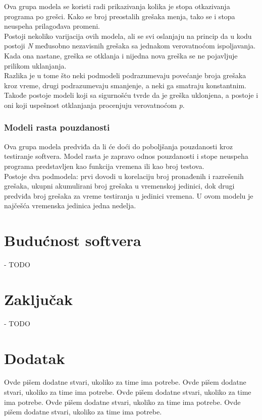 \documentclass[a4paper]{article}
\begin{document}
Ova grupa modela se koristi radi prikazivanja kolika je stopa otkazivanja programa po grešci. Kako se broj preostalih grešaka menja, tako se i stopa neuspeha prilagođava promeni.\\
Postoji nekoliko varijacija ovih modela, ali se svi oslanjaju na princip da u kodu postoji \textit{N} međusobno nezavisnih grešaka sa jednakom verovatnoćom ispoljavanja. Kada ona nastane, greška se otklanja i nijedna nova greška se ne pojavljuje prilikom uklanjanja.\\
Razlika je u tome što neki podmodeli podrazumevaju povećanje broja grešaka kroz vreme, drugi podrazumevaju smanjenje, a neki ga smatraju konstantnim. Takođe postoje modeli koji sa sigurnošću tvrde da je greška uklonjena, a postoje i oni koji uspešnost otklanjanja procenjuju verovatnoćom \textit{p}.

\subsubsection{Modeli rasta pouzdanosti}
\label{subsec:rast_pouzdanosti}

Ova grupa modela predviđa da li će doći do poboljšanja pouzdanosti kroz testiranje softvera. Model rasta je zapravo odnos pouzdanosti i stope neuspeha programa predstavljen kao funkcija vremena ili kao broj testova.\\
Postoje dva podmodela: prvi dovodi u korelaciju broj pronađenih i razrešenih grešaka, ukupni akumulirani broj grešaka u vremenskoj jedinici, dok drugi predviđa broj grešaka za vreme testiranja u jedinici vremena. U ovom modelu je najčešća vremenska jedinica jedna nedelja.

\section{Budućnost softvera}
\label{buducnost}

- TODO \\

\section{Zaključak}
\label{sec:zakljucak}

- TODO \\

\appendix
 


\appendix
\section{Dodatak}
Ovde pišem dodatne stvari, ukoliko za time ima potrebe.
Ovde pišem dodatne stvari, ukoliko za time ima potrebe.
Ovde pišem dodatne stvari, ukoliko za time ima potrebe.
Ovde pišem dodatne stvari, ukoliko za time ima potrebe.
Ovde pišem dodatne stvari, ukoliko za time ima potrebe.
\end{document}
